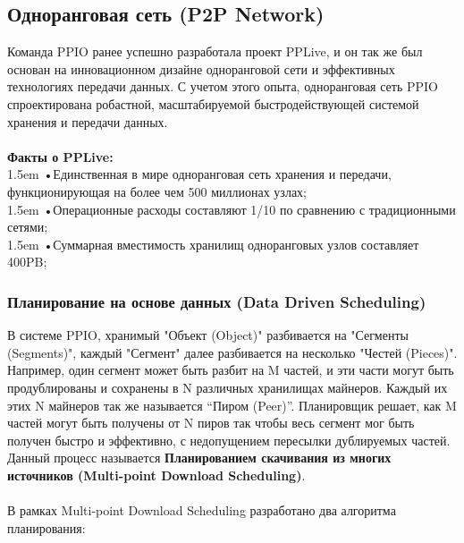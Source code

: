 \documentclass[10pt,a4paper]{article}
\begin{document}
\subsection{Одноранговая сеть (P2P Network)} %
Команда PPIO ранее успешно разработала проект PPLive, и он так же был основан на инновационном дизайне одноранговой сети и эффективных технологиях передачи данных\cite{article4}\cite{article5}\cite{article6}\cite{article7}. С учетом этого опыта, одноранговая сеть PPIO спроектирована робастной, масштабируемой быстродействующей системой хранения и передачи данных.
\vspace{-0.5em}
\\ \\{\bf Факты о PPLive:}
\vspace{-0.8em}
\\ 

\hangindent 1.5em
\noindent   
•\quad Единственная в мире одноранговая сеть хранения и передачи, функционирующая на более чем 500 миллионах узлах;
\vspace{-0.8em}
\\ 

\hangindent 1.5em
\noindent   
•\quad Операционные расходы составляют 1/10 по сравнению с традиционными сетями;
\vspace{-0.8em}
\\ 

\hangindent 1.5em
\noindent   
•\quad Суммарная вместимость хранилищ одноранговых узлов составляет 400PB;
\vspace{-0.5em}

\subsubsection{Планирование на основе данных (Data Driven Scheduling)}  %
В системе PPIO, хранимый "Объект (Object)" разбивается на "Сегменты (Segments)", каждый "Сегмент" далее разбивается на несколько "Честей (Pieces)". Например, один сегмент может быть разбит на M частей, и эти части могут быть продублированы и сохранены в N различных хранилищах майнеров. Каждый их этих N майнеров так же называется “Пиром (Peer)”. Планировщик решает, как M частей могут быть получены от N пиров так чтобы весь сегмент мог быть получен быстро и эффективно, с недопущением пересылки дублируемых частей. Данный процесс называется {\bf Планированием скачивания из многих источников (Multi-point Download Scheduling)}.
\vspace{-0.5em}
\\ \\В рамках Multi-point Download Scheduling разработано два алгоритма планирования:
\vspace{-0.8em}
\\ 
\end{document}
